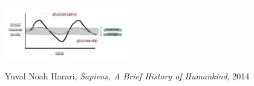 \documentclass{article}
\begin{document}
\begin{minipage}{\textwidth}
    \centering
    \includegraphics[width=0.4\textwidth]{glycogen.png}
\end{minipage}

\vspace*{-0.5cm}
\printnoidxglossary[style=listdotted]

\begin{thebibliography}{8}
     Yuval Noah Harari, \emph{Sapiens, A Brief History of Humankind}, 2014

\end{thebibliography}
\end{document}
